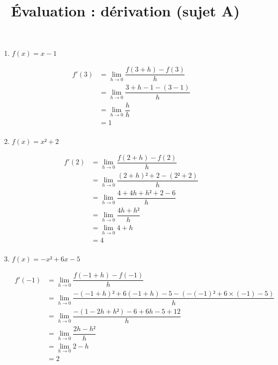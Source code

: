 \documentclass[
	classe=$1^{ere}STI2D$,
]{évaluation}
\begin{document}
\title{Évaluation : dérivation (sujet A)}
\maketitle

\begin{exercice}
	\begin{enumerate}
		\item $f(x) = x - 1$

		      \begin{align*}
			      f'(3) & = \lim_{h→0} \dfrac{f(3+h) - f(3)}{h}       \\
			            & = \lim_{h→0} \dfrac{3 + h - 1 - (3 - 1)}{h} \\
			            & = \lim_{h→0} \dfrac{h}{h}                   \\
			            & = 1                                         \\
		      \end{align*}
		\item $f(x) = x² + 2$

		      \begin{align*}
			      f'(2) & = \lim_{h→0} \dfrac{f(2+h) - f(2)}{h}           \\
			            & = \lim_{h→0} \dfrac{(2 + h)² + 2 - (2² + 2)}{h} \\
			            & = \lim_{h→0} \dfrac{4 + 4h + h² + 2 - 6}{h}     \\
			            & = \lim_{h→0} \dfrac{4h + h²}{h}                 \\
			            & = \lim_{h→0} 4 + h                              \\
			            & = 4                                             \\
		      \end{align*}
		\item $f(x) = -x² + 6x - 5$

		      \begin{align*}
			      f'(-1) & = \lim_{h→0} \dfrac{f(-1+h) - f(-1)}{h}                                    \\
			             & = \lim_{h→0} \dfrac{-(-1 + h)² + 6(-1 + h) - 5 - (-(-1)² + 6×(-1) - 5)}{h} \\
			             & = \lim_{h→0} \dfrac{-(1 - 2h + h²) - 6 + 6h - 5 + 12}{h}                   \\
			             & = \lim_{h→0} \dfrac{2h - h²}{h}                                            \\
			             & = \lim_{h→0} 2 - h                                                         \\
			             & = 2                                                                        \\
		      \end{align*}
	\end{enumerate}
\end{exercice}
\end{document}
